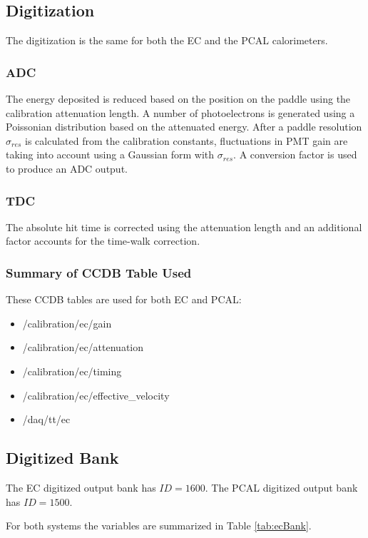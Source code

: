 \subsection{Digitization}
The digitization is the same for both the EC and the PCAL calorimeters.

\subsubsection{ADC}

The energy deposited is reduced based on the position on the paddle using the calibration attenuation length.
A number of photoelectrons is generated using a Poissonian distribution based on the attenuated energy.
After a paddle resolution $\sigma_{res}$ is calculated from the calibration constants, fluctuations in PMT gain
are taking into account using a Gaussian form with $\sigma_{res}$. A conversion factor is used to produce an ADC output.

\subsubsection{TDC}
The absolute hit time is corrected using the attenuation length and an additional factor accounts for the time-walk correction.

\subsubsection{Summary of CCDB Table Used}

These CCDB tables are used for both EC and PCAL:

\begin{itemize}
	\item /calibration/ec/gain
	\item /calibration/ec/attenuation
	\item /calibration/ec/timing
	\item /calibration/ec/effective\_velocity
	\item /daq/tt/ec
\end{itemize}

\subsection{Digitized Bank}
The EC digitized output bank has $ID=1600$.
The PCAL digitized output bank has $ID=1500$.

For both systems the variables are summarized in Table \ref{tab:ecBank}.

